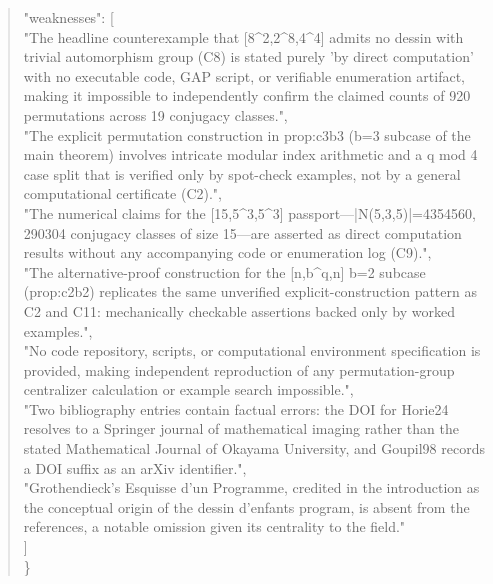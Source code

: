 \documentclass[11pt]{article}
\begin{document}
\begin{quote}
  "weaknesses": [\\
    "The headline counterexample that [8\^{}2,2\^{}8,4\^{}4] admits no dessin with trivial automorphism group (C8) is stated purely 'by direct computation' with no executable code, GAP script, or verifiable enumeration artifact, making it impossible to independently confirm the claimed counts of 920 permutations across 19 conjugacy classes.",\\
    "The explicit permutation construction in prop:c3b3 (b=3 subcase of the main theorem) involves intricate modular index arithmetic and a q mod 4 case split that is verified only by spot-check examples, not by a general computational certificate (C2).",\\
    "The numerical claims for the [15,5\^{}3,5\^{}3] passport---|N(5,3,5)|=4354560, 290304 conjugacy classes of size 15---are asserted as direct computation results without any accompanying code or enumeration log (C9).",\\
    "The alternative-proof construction for the [n,b\^{}q,n] b=2 subcase (prop:c2b2) replicates the same unverified explicit-construction pattern as C2 and C11: mechanically checkable assertions backed only by worked examples.",\\
    "No code repository, scripts, or computational environment specification is provided, making independent reproduction of any permutation-group centralizer calculation or example search impossible.",\\
    "Two bibliography entries contain factual errors: the DOI for Horie24 resolves to a Springer journal of mathematical imaging rather than the stated Mathematical Journal of Okayama University, and Goupil98 records a DOI suffix as an arXiv identifier.",\\
    "Grothendieck's Esquisse d'un Programme, credited in the introduction as the conceptual origin of the dessin d'enfants program, is absent from the references, a notable omission given its centrality to the field."\\
  ]\\
\}\\
\end{quote}
\end{document}
